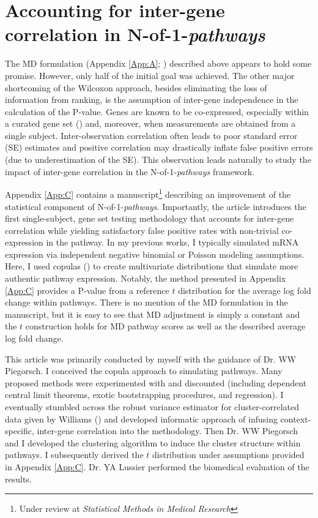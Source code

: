 \chapter{Accounting for inter-gene correlation in N-of-1-\emph{pathways}} \label{Chap:ct}

\indent \indent The MD formulation (Appendix \ref{App:A}; \cite{Schissler2015}) described above appears to hold some promise. However, only half of the initial goal was achieved. The other major shortcoming of the Wilcoxon approach, besides eliminating the loss of information from ranking, is the assumption of inter-gene independence in the calculation of the P-value. Genes are known to be co-expressed, especially within a curated gene set (\cite{Tamayo2016}) and, moreover, when measurements are obtained from a single subject. Inter-observation correlation often leads to poor standard error (SE) estimates and positive correlation may drastically inflate false positive errors (due to underestimation of the SE). This observation leads naturally to study the impact of inter-gene correlation in the N-of-1-\emph{pathways} framework.

Appendix \ref{App:C} contains a manuscript\footnote{Under review at \emph{Statistical Methods in Medical Research}} describing an improvement of the statistical component of N-of-1-\emph{pathways}. Importantly, the article introduces the first single-subject, gene set testing methodology that accounts for inter-gene correlation while yielding satisfactory false positive rates with non-trivial co-expression in the pathway. In my previous works, I typically simulated mRNA expression via independent negative binomial or Poisson modeling assumptions. Here, I used copulas (\cite{Genest2007,Yan2007}) to create multivariate distributions that simulate more authentic pathway expression. Notably, the method presented in Appendix \ref{App:C} provides a P-value from a reference $t$ distribution for the average log fold change within pathways. There is no mention of the MD formulation in the manuscript, but it is easy to see that MD adjustment is simply a constant and the $t$ construction holds for MD pathway scores as well as the described average log fold change.

This article was primarily conducted by myself with the guidance of Dr. WW Piegorsch. I conceived the copula approach to simulating pathways. Many proposed methods were experimented with and discounted (including dependent central limit theorems, exotic bootstrapping procedures, and regression). I eventually stumbled across the robust variance estimator for cluster-correlated data given by Williams (\cite{Williams2000}) and developed informatic approach of infusing context-specific, inter-gene correlation into the methodology. Then Dr. WW Piegorsch and I developed the clustering algorithm to induce the cluster structure within pathways. I subsequently derived the $t$ distribution under assumptions provided in Appendix \ref{App:C}. Dr. YA Lussier performed the biomedical evaluation of the results.
